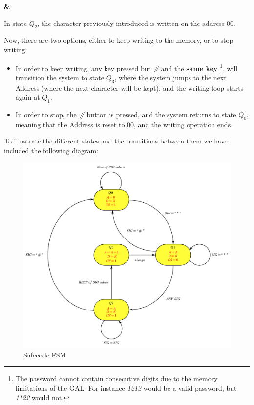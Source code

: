  \textbf{\&} \medskip

In state $Q_2$, the character previously introduced is written on the address $00$.\medskip

\clearpage

Now, there are two options, either to keep writing to the memory, or to stop writing:

\begin{itemize}
    \item In order to keep writing, any key pressed but \textit{\#} and the \textbf{same key} \footnote{The password cannot contain consecutive digits due to the memory limitations of the GAL. For instance \textit{1212} would be a valid password, but \textit{1122} would not.}, will transition the system to state $Q_3$, where the system jumps to the next Address (where the next character will be kept), and the writing loop starts again at \textit{$Q_1$}.
    
    \item In order to stop, the  \textit{\#} button is pressed, and the system returns to state \textit{$Q_0$}, meaning that  the Address is reset to $00$, and the writing operation ends.
\end{itemize}


To illustrate the different states and the transitions between them we have included the following diagram:\medskip

\begin{figure}[H]
    \centering
    \includegraphics[scale = 0.55]{Graphics/Practice 6/SAFECODE/SAFECODE_FSM.pdf}
    \caption{Safecode FSM}
    \label{fig:SAFECODE_FSM}
\end{figure}


